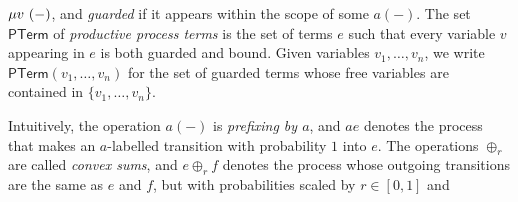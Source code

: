 \documentclass[11pt,a4paper]{amsart}
\begin{document}
\hypertarget{html:S3.SS0.SSS0.Px1.p1.m7}{}\({\mu v\leavevmode\nobreak\ (-)}\), and \emph{guarded} if it appears within the scope of some %
\hypertarget{html:S3.SS0.SSS0.Px1.p1.m8}{}\({a(-)}\). The set %
\hypertarget{html:S3.SS0.SSS0.Px1.p1.m9}{}\({\mathsf{PTerm}}\) of \emph{productive process terms} is the set of terms %
\hypertarget{html:S3.SS0.SSS0.Px1.p1.m10}{}\({e}\) such that every variable %
\hypertarget{html:S3.SS0.SSS0.Px1.p1.m11}{}\({v}\) appearing in %
\hypertarget{html:S3.SS0.SSS0.Px1.p1.m12}{}\({e}\) is both guarded and bound. Given variables %
\hypertarget{html:S3.SS0.SSS0.Px1.p1.m13}{}\({v_{1},\dots,v_{n}}\), we write %
\hypertarget{html:S3.SS0.SSS0.Px1.p1.m14}{}\({\mathsf{PTerm}(v_{1},\dots,v_{n})}\) for the set of guarded terms whose free variables are contained in %
\hypertarget{html:S3.SS0.SSS0.Px1.p1.m15}{}\({\{v_{1},\dots,v_{n}\}}\).
\par\medskip
\hypertarget{html:S3.SS0.SSS0.Px1.p2}{} Intuitively, the operation %
\hypertarget{html:S3.SS0.SSS0.Px1.p2.m1}{}\({a(-)}\) is \emph{prefixing by %
\hypertarget{html:S3.SS0.SSS0.Px1.p2.m2}{}\({a}\)}, and %
\hypertarget{html:S3.SS0.SSS0.Px1.p2.m3}{}\({ae}\) denotes the process that makes an %
\hypertarget{html:S3.SS0.SSS0.Px1.p2.m4}{}\({a}\)-labelled transition with probability %
\hypertarget{html:S3.SS0.SSS0.Px1.p2.m5}{}\({1}\) into %
\hypertarget{html:S3.SS0.SSS0.Px1.p2.m6}{}\({e}\). The operations %
\hypertarget{html:S3.SS0.SSS0.Px1.p2.m7}{}\({\oplus_{r}}\) are called \emph{convex sums}, and %
\hypertarget{html:S3.SS0.SSS0.Px1.p2.m8}{}\({e\oplus_{r}f}\) denotes the process whose outgoing transitions are the same as %
\hypertarget{html:S3.SS0.SSS0.Px1.p2.m9}{}\({e}\) and %
\hypertarget{html:S3.SS0.SSS0.Px1.p2.m10}{}\({f}\), but with probabilities scaled by %
\hypertarget{html:S3.SS0.SSS0.Px1.p2.m11}{}\({r\in[0,1]}\) and %
\end{document}
